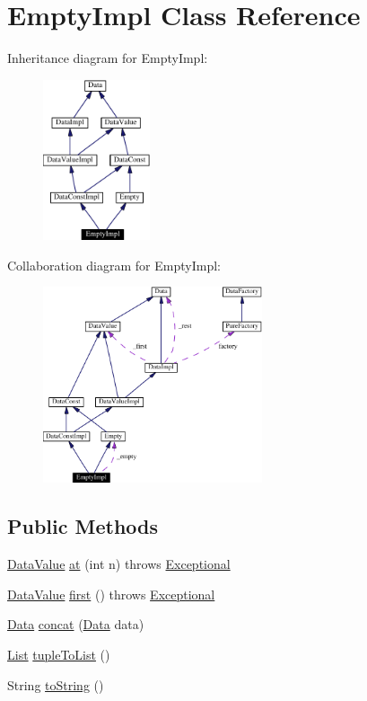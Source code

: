 \hypertarget{classEmptyImpl}{
\section{Empty\-Impl  Class Reference}
\label{classEmptyImpl}
}
Inheritance diagram for Empty\-Impl:\begin{figure}[H]
\begin{center}
\leavevmode
\includegraphics[width=89pt]{classEmptyImpl__inherit__graph}
\end{center}
\end{figure}
Collaboration diagram for Empty\-Impl:\begin{figure}[H]
\begin{center}
\leavevmode
\includegraphics[width=183pt]{classEmptyImpl__coll__graph}
\end{center}
\end{figure}
\subsection*{Public Methods}
\begin{CompactItemize}
\item 
\hyperlink{interfaceDataValue}{Data\-Value} \hyperlink{classEmptyImpl_a0}{at} (int n) throws \hyperlink{classExceptional}{Exceptional}
\item 
\hyperlink{interfaceDataValue}{Data\-Value} \hyperlink{classEmptyImpl_a1}{first} () throws \hyperlink{classExceptional}{Exceptional}
\item 
\hyperlink{interfaceData}{Data} \hyperlink{classEmptyImpl_a2}{concat} (\hyperlink{interfaceData}{Data} data)
\item 
\hyperlink{interfaceList}{List} \hyperlink{classEmptyImpl_a3}{tuple\-To\-List} ()
\item 
String \hyperlink{classEmptyImpl_a4}{to\-String} ()
\end{CompactItemize}


